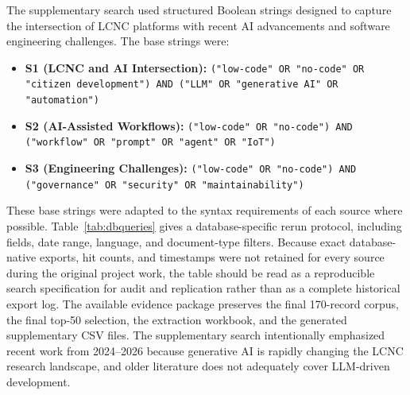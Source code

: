 \documentclass[conference]{IEEEtran}
\begin{document}
The supplementary search used structured Boolean strings designed to capture the intersection of LCNC platforms with recent AI advancements and software engineering challenges. The base strings were:

\begin{itemize}
    \item \textbf{S1 (LCNC and AI Intersection):} \texttt{("low-code" OR "no-code" OR "citizen development") AND ("LLM" OR "generative AI" OR "automation")}
    \item \textbf{S2 (AI-Assisted Workflows):} \texttt{("low-code" OR "no-code") AND ("workflow" OR "prompt" OR "agent" OR "IoT")}
    \item \textbf{S3 (Engineering Challenges):} \texttt{("low-code" OR "no-code") AND ("governance" OR "security" OR "maintainability")}
\end{itemize}

These base strings were adapted to the syntax requirements of each source where possible. Table~\ref{tab:dbqueries} gives a database-specific rerun protocol, including fields, date range, language, and document-type filters. Because exact database-native exports, hit counts, and timestamps were not retained for every source during the original project work, the table should be read as a reproducible search specification for audit and replication rather than as a complete historical export log. The available evidence package preserves the final 170-record corpus, the final top-50 selection, the extraction workbook, and the generated supplementary CSV files. The supplementary search intentionally emphasized recent work from 2024--2026 because generative AI is rapidly changing the LCNC research landscape, and older literature does not adequately cover LLM-driven development.
\end{document}
